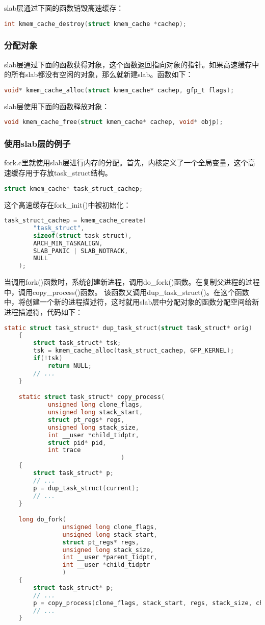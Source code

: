 \documentclass[a4paper,left=2.5cm,right=2.5cm,11pt]{article}
\begin{document}
	slab层通过下面的函数销毁高速缓存：
	\begin{lstlisting}[language = C]
	int kmem_cache_destroy(struct kmem_cache *cachep);
	\end{lstlisting}

\subsubsection{分配对象}
	slab层通过下面的函数获得对象，这个函数返回指向对象的指针。如果高速缓存中的所有slab都没有空闲的对象，那么就新建slab。函数如下：
	\begin{lstlisting}[language = C]
	void* kmem_cache_alloc(struct kmem_cache* cachep, gfp_t flags);
	\end{lstlisting}

	slab层使用下面的函数释放对象：
	\begin{lstlisting}[language = C]
	void kmem_cache_free(struct kmem_cache* cachep, void* objp);
	\end{lstlisting}

\subsubsection{使用slab层的例子}
	fork.c里就使用slab层进行内存的分配。首先，内核定义了一个全局变量，这个高速缓存用于存放task\_struct结构。
	\begin{lstlisting}[language = C]
	struct kmem_cache* task_struct_cachep;
	\end{lstlisting}

	这个高速缓存在fork\_init()中被初始化：
	\begin{lstlisting}[language = C]
	task_struct_cachep = kmem_cache_create(
		"task_struct",
		sizeof(struct task_struct),
		ARCH_MIN_TASKALIGN,
		SLAB_PANIC | SLAB_NOTRACK,
		NULL
	);
	\end{lstlisting}

	当调用fork()函数时，系统创建新进程，调用do\_fork()函数。在复制父进程的过程中，调用copy\_process()函数。
	该函数又调用dup\_task\_struct()。在这个函数中，将创建一个新的进程描述符，这时就用slab层中分配对象的函数分配空间给新进程描述符，代码如下：
	\begin{lstlisting}[language = C]
	static struct task_struct* dup_task_struct(struct task_struct* orig)
	{
		struct task_struct* tsk;
		tsk = kmem_cache_alloc(task_struct_cachep, GFP_KERNEL);
		if(!tsk)
			return NULL;
		// ...
	}

	static struct task_struct* copy_process(
			unsigned long clone_flags,
			unsigned long stack_start,
			struct pt_regs* regs,
			unsigned long stack_size,
			int __user *child_tidptr,
			struct pid* pid,
			int trace
								)
	{
		struct task_struct* p;
		// ...
		p = dup_task_struct(current);
		// ...
	}

	long do_fork(
				unsigned long clone_flags,
				unsigned long stack_start,
				struct pt_regs* regs,
				unsigned long stack_size,
				int __user *parent_tidptr,
				int __user *child_tidptr
				)
	{
		struct task_struct* p;
		// ...
		p = copy_process(clone_flags, stack_start, regs, stack_size, child_tidptr, NULL, trace);
		// ...
	}
	\end{lstlisting}
\end{document}
